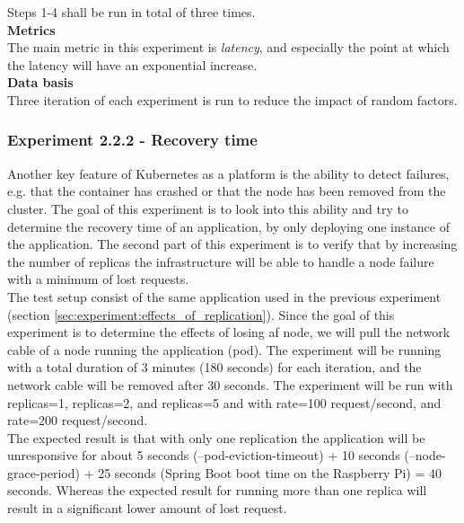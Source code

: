 \noindent Steps 1-4 shall be run in total of three times.\\


\noindent\textbf{Metrics}\\
The main metric in this experiment is \textit{latency}, and especially the point at which the latency will have an exponential increase. \\

\noindent\textbf{Data basis}\\
Three iteration of each experiment is run to reduce the impact of random factors.

\subsubsection*{Experiment 2.2.2 - Recovery time} 
\label{sec:experiment:recovery}
Another key feature of Kubernetes as a platform is the ability to detect failures, e.g. that the container has crashed or that the node has been removed from the cluster. The goal of this experiment is to look into this ability and try to determine the recovery time of an application, by only deploying one instance of the application. The second part of this experiment is to verify that by increasing the number of replicas the infrastructure will be able to handle a node failure with a minimum of lost requests. \\ 

\noindent The test setup consist of the same application used in the previous experiment (section \ref{sec:experiment:effects_of_replication}). Since the goal of this experiment is to determine the effects of losing af node, we will pull the network cable of a node running the application (pod). The experiment will be running with a total duration of 3 minutes (180 seconds) for each iteration, and the network cable will be removed after 30 seconds. The experiment will be run with replicas=1, replicas=2, and replicas=5 and with rate=100 request/second, and rate=200 request/second.\\

\noindent The expected result is that with only one replication the application will be unresponsive for about 5 seconds (--pod-eviction-timeout) + 10 seconds (--node-grace-period) + 25 seconds (Spring Boot boot time on the Raspberry Pi) = 40 seconds. Whereas the expected result for running more than one replica will result in a significant lower amount of lost request.

